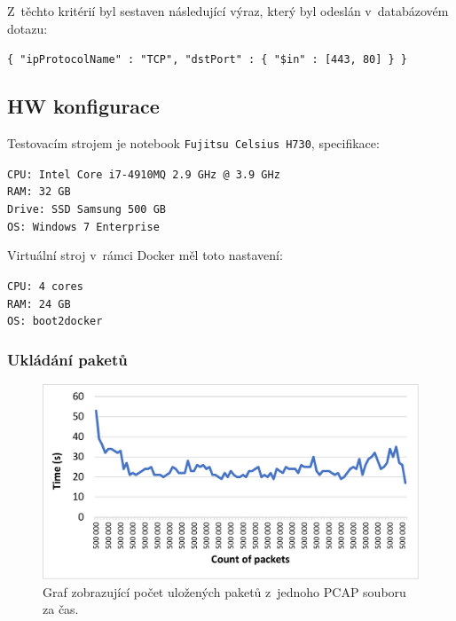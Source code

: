 \vspace{0.5cm}
\noindent Z~těchto kritérií byl sestaven následující výraz, který byl odeslán v~databázovém dotazu:

\vspace{0.5cm}
\verb|{ "ipProtocolName" : "TCP", "dstPort" : { "$in" : [443, 80] } }|

\subsection{HW konfigurace}
Testovacím strojem je notebook \texttt{Fujitsu Celsius H730}, specifikace:

\vspace{0.5cm}
\noindent \texttt{CPU: Intel Core i7-4910MQ 2.9 GHz @ 3.9 GHz} \\
\texttt{RAM: 32 GB} \\
\texttt{Drive: SSD Samsung 500 GB} \\
\texttt{OS: Windows 7 Enterprise}

\vspace{0.5cm}
\noindent Virtuální stroj v~rámci Docker měl toto nastavení:

\vspace{0.5cm}
\noindent \texttt{CPU: 4 cores} \\
\texttt{RAM: 24 GB} \\
\texttt{OS: boot2docker}

\subsubsection{Ukládání paketů}

\begin{figure}[!h]
    \centering
    \includegraphics[width=15cm]{template-fig/PerformanceChartFinalBigData.pdf}
    \caption{Graf zobrazující počet uložených paketů z~jednoho PCAP souboru za čas.}
    \label{FIG_PerformanceChartFinalBigData}
\end{figure}

